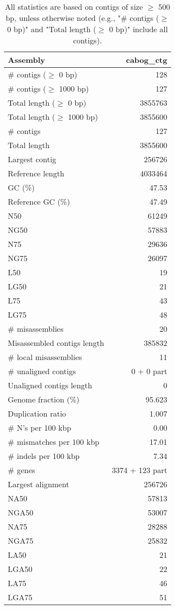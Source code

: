 \documentclass[12pt,a4paper]{article}
\begin{document}
\begin{table}[ht]
\begin{center}
\caption{All statistics are based on contigs of size $\geq$ 500 bp, unless otherwise noted (e.g., "\# contigs ($\geq$ 0 bp)" and "Total length ($\geq$ 0 bp)" include all contigs).}
\begin{tabular}{|l*{1}{|r}|}
\hline
Assembly & cabog\_ctg \\ \hline
\# contigs ($\geq$ 0 bp) & 128 \\ \hline
\# contigs ($\geq$ 1000 bp) & 127 \\ \hline
Total length ($\geq$ 0 bp) & 3855763 \\ \hline
Total length ($\geq$ 1000 bp) & 3855600 \\ \hline
\# contigs & 127 \\ \hline
Total length & 3855600 \\ \hline
Largest contig & 256726 \\ \hline
Reference length & 4033464 \\ \hline
GC (\%) & 47.53 \\ \hline
Reference GC (\%) & 47.49 \\ \hline
N50 & 61249 \\ \hline
NG50 & 57883 \\ \hline
N75 & 29636 \\ \hline
NG75 & 26097 \\ \hline
L50 & 19 \\ \hline
LG50 & 21 \\ \hline
L75 & 43 \\ \hline
LG75 & 48 \\ \hline
\# misassemblies & 20 \\ \hline
Misassembled contigs length & 385832 \\ \hline
\# local misassemblies & 11 \\ \hline
\# unaligned contigs & 0 + 0 part \\ \hline
Unaligned contigs length & 0 \\ \hline
Genome fraction (\%) & 95.623 \\ \hline
Duplication ratio & 1.007 \\ \hline
\# N's per 100 kbp & 0.00 \\ \hline
\# mismatches per 100 kbp & 17.01 \\ \hline
\# indels per 100 kbp & 7.34 \\ \hline
\# genes & 3374 + 123 part \\ \hline
Largest alignment & 256726 \\ \hline
NA50 & 57813 \\ \hline
NGA50 & 53007 \\ \hline
NA75 & 28288 \\ \hline
NGA75 & 25832 \\ \hline
LA50 & 21 \\ \hline
LGA50 & 22 \\ \hline
LA75 & 46 \\ \hline
LGA75 & 51 \\ \hline
\end{tabular}
\end{center}
\end{table}
\end{document}

